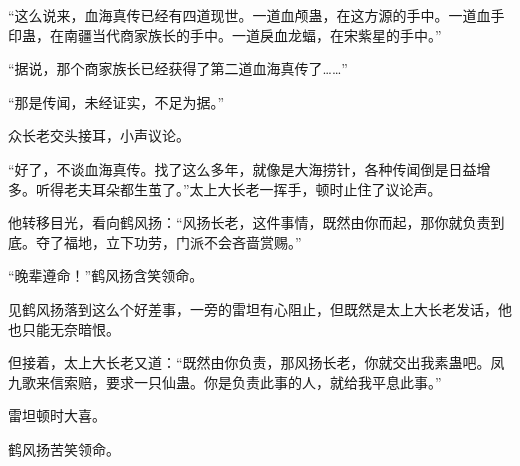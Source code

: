 \begin{this_body}
“这么说来，血海真传已经有四道现世。一道血颅蛊，在这方源的手中。一道血手印蛊，在南疆当代商家族长的手中。一道戾血龙蝠，在宋紫星的手中。”

“据说，那个商家族长已经获得了第二道血海真传了……”

“那是传闻，未经证实，不足为据。”

众长老交头接耳，小声议论。

“好了，不谈血海真传。找了这么多年，就像是大海捞针，各种传闻倒是日益增多。听得老夫耳朵都生茧了。”太上大长老一挥手，顿时止住了议论声。

他转移目光，看向鹤风扬：“风扬长老，这件事情，既然由你而起，那你就负责到底。夺了福地，立下功劳，门派不会吝啬赏赐。”

“晚辈遵命！”鹤风扬含笑领命。

见鹤风扬落到这么个好差事，一旁的雷坦有心阻止，但既然是太上大长老发话，他也只能无奈暗恨。

但接着，太上大长老又道：“既然由你负责，那风扬长老，你就交出我素蛊吧。凤九歌来信索赔，要求一只仙蛊。你是负责此事的人，就给我平息此事。”

雷坦顿时大喜。

鹤风扬苦笑领命。

\end{this_body}

